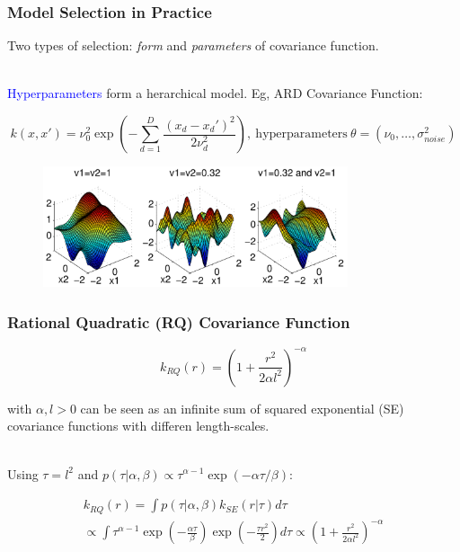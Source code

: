 \documentclass[10pt]{beamer}
\begin{document}
  \begin{frame}
    \frametitle{Model Selection in Practice}

    Two types of selection: \emph{form} and \emph{parameters} of covariance function.\\~

    \textcolor{blue}{Hyperparameters} form a herarchical model. Eg, ARD Covariance Function:

    \begin{equation*}
      k(x,x') = \nu_0^2 \exp \left( - \sum_{d=1}^D \frac{(x_d - x_d')^2}{2\nu_d^2} \right),~\text{hyperparameters}~\theta = (\nu_0,\dots,\sigma_{noise}^2)
    \end{equation*}

    \begin{figure}
      \centering
      \includegraphics[width=0.8\textwidth]{hyperparameters.png}
    \end{figure}
  \end{frame}

  \begin{frame}
    \frametitle{Rational Quadratic (RQ) Covariance Function}

    \begin{equation*}
      k_{RQ}(r) = \left( 1 + \frac{r^2}{2 \alpha l^2} \right)^{- \alpha}
    \end{equation*}

    with $\alpha, l > 0$ can be seen as an infinite sum of squared exponential (SE) covariance functions with differen length-scales.\\~

    \pause

    Using $\tau = l^2$ and $p(\tau | \alpha, \beta) \propto \tau^{\alpha - 1} \exp (- \alpha \tau / \beta)$:

    \begin{equation*}
      \begin{array}{c}
        k_{RQ}(r) = \int p(\tau | \alpha, \beta) k_{SE}(r| \tau) d\tau \\
        \propto \int \tau^{\alpha - 1} \exp \left( - \frac{\alpha \tau}{\beta} \right) \exp \left( - \frac{\tau r^2}{2} \right) d \tau \propto \left( 1 + \frac{r^2}{2 \alpha l^2} \right)^{- \alpha}
      \end{array}
    \end{equation*}
  \end{frame}
\end{document}
